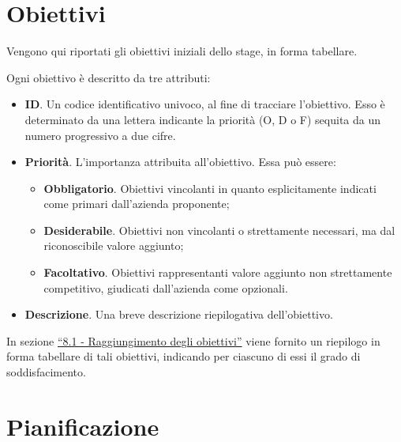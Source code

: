 \section{Obiettivi}

Vengono qui riportati gli obiettivi iniziali dello stage, in forma tabellare.

Ogni obiettivo è descritto da tre attributi:

\begin{itemize}
    \item \textbf{ID}. Un codice identificativo univoco, al fine di tracciare l'obiettivo. Esso è determinato da una lettera indicante la priorità (O, D o F) sequita da un numero progressivo a due cifre.
    \item \textbf{Priorità}. L'importanza attribuita all'obiettivo. Essa può essere:
    \begin{itemize}
        \item \textbf{Obbligatorio}. Obiettivi vincolanti in quanto esplicitamente indicati come primari dall'azienda proponente; 
        \item \textbf{Desiderabile}. Obiettivi non vincolanti o strettamente necessari, ma dal riconoscibile valore
        aggiunto;
        \item \textbf{Facoltativo}. Obiettivi rappresentanti valore aggiunto non strettamente competitivo, giudicati dall'azienda come opzionali.
    \end{itemize} 
    \item \textbf{Descrizione}. Una breve descrizione riepilogativa dell'obiettivo. 
\end{itemize}



In sezione {\hyperref[sec:obiettivi-raggiunti]{``8.1 - Raggiungimento degli obiettivi''}} viene fornito un riepilogo in forma tabellare di tali obiettivi, indicando per ciascuno di essi il grado di soddisfacimento.

\section{Pianificazione}

